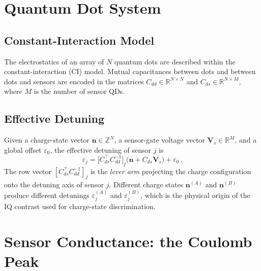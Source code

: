 \documentclass[11pt,a4paper]{article}
\begin{document}
\section{Quantum Dot System}

\subsection{Constant-Interaction Model}

The electrostatics of an array of $N$ quantum dots are described within the
constant-interaction (CI) model.
Mutual capacitances between dots and between dots and sensors are encoded in
the matrices $C_{dd} \in \mathbb{R}^{N\times N}$ and
$C_{ds} \in \mathbb{R}^{N\times M}$, where $M$ is the number of sensor QDs.

\subsection{Effective Detuning}

Given a charge-state vector $\mathbf{n}\in\mathbb{Z}^{N}$, a sensor-gate
voltage vector $\mathbf{V}_s\in\mathbb{R}^{M}$, and a global offset
$\varepsilon_0$, the effective detuning of sensor $j$ is
\begin{equation}
  \varepsilon_j
  = \bigl[C_{ds}^{\top}C_{dd}^{-1}\bigr]_{j}
    \bigl(\mathbf{n} + C_{ds}\mathbf{V}_s\bigr)
    + \varepsilon_0 \,.
  \label{eq:detuning}
\end{equation}
The row vector $[C_{ds}^{\top}C_{dd}^{-1}]_j$ is the \emph{lever arm}
projecting the charge configuration onto the detuning axis of sensor $j$.
Different charge states $\mathbf{n}^{(A)}$ and $\mathbf{n}^{(B)}$ produce
different detunings $\varepsilon^{(A)}_j$ and $\varepsilon^{(B)}_j$, which
is the physical origin of the IQ contrast used for charge-state
discrimination.

\section{Sensor Conductance: the Coulomb Peak}
\end{document}
